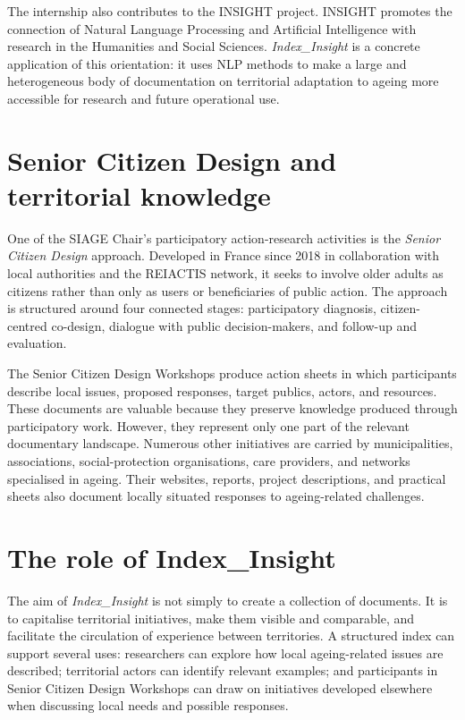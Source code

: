 \documentclass[
11pt,
english,
singlespacing,
headsepline,
]{MastersDoctoralThesis}
\begin{document}
The internship also contributes to the INSIGHT project. INSIGHT promotes the
connection of Natural Language Processing and Artificial Intelligence with
research in the Humanities and Social Sciences. \textit{Index\_Insight} is a
concrete application of this orientation: it uses NLP methods to make a large
and heterogeneous body of documentation on territorial adaptation to ageing more
accessible for research and future operational use.

\section{Senior Citizen Design and territorial knowledge}

One of the SIAGE Chair's participatory action-research activities is the
\textit{Senior Citizen Design} approach. Developed in France since 2018 in
collaboration with local authorities and the REIACTIS network, it seeks to
involve older adults as citizens rather than only as users or beneficiaries of
public action. The approach is structured around four connected stages:
participatory diagnosis, citizen-centred co-design, dialogue with public
decision-makers, and follow-up and evaluation.

The Senior Citizen Design Workshops produce action sheets in which participants
describe local issues, proposed responses, target publics, actors, and resources.
These documents are valuable because they preserve knowledge produced through
participatory work. However, they represent only one part of the relevant
documentary landscape. Numerous other initiatives are carried by municipalities,
associations, social-protection organisations, care providers, and networks
specialised in ageing. Their websites, reports, project descriptions, and
practical sheets also document locally situated responses to ageing-related
challenges.

\section{The role of Index\_Insight}

The aim of \textit{Index\_Insight} is not simply to create a collection of
documents. It is to capitalise territorial initiatives, make them visible and
comparable, and facilitate the circulation of experience between territories. A
structured index can support several uses: researchers can explore how local
ageing-related issues are described; territorial actors can identify relevant
examples; and participants in Senior Citizen Design Workshops can draw on
initiatives developed elsewhere when discussing local needs and possible
responses.
\end{document}
